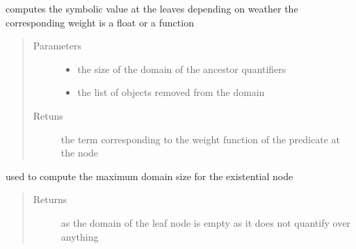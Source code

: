 \documentclass[letterpaper,10pt,english,openany,oneside]{sphinxmanual}
\begin{document}
\begin{fulllineitems}
\begin{fulllineitems}
\label{\detokenize{index:circuit.LeafNode.compute}}
computes the symbolic value at the leaves depending on weather the corresponding weight is a float or a function
\begin{quote}\begin{description}
\item[{Parameters}] \leavevmode\begin{itemize}
\item {} 
 \textendash{} the size of the domain of the ancestor quantifiers

\item {} 
 \textendash{} the list of objects removed from the domain

\end{itemize}

\item[{Retuns}] \leavevmode
the term corresponding to the weight function of the predicate at the node

\end{description}\end{quote}

\end{fulllineitems}


\begin{fulllineitems}
\label{\detokenize{index:circuit.LeafNode.maxDomainSize}}
used to compute the maximum domain size for the existential node
\begin{quote}\begin{description}
\item[{Returns}]  as the domain of the leaf node is empty as it does not quantify over anything

\end{description}\end{quote}

\end{fulllineitems}


\end{fulllineitems}
\end{document}
